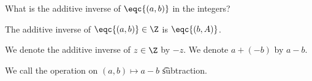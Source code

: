 

What is the additive inverse of $\eqc{(a, b)}$ in the integers?


\begin{proposition}
  The additive inverse of $\eqc{(a, b)} \in \Z$ is $\eqc{(b, A)}$.
\end{proposition}


We denote the additive inverse of $z \in \Z$ by $-z$.
We denote $a + (- b)$ by $a - b$.


We call the operation on $(a, b) \mapsto a - b$ \t{subtraction}.

\blankpage
